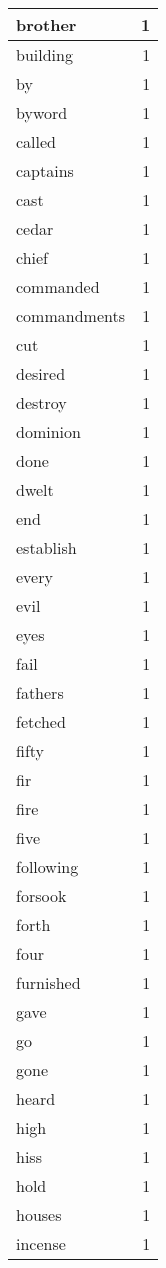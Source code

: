 \begin{center}
\begin{longtable}{l|r}
brother & 1 \\ \hline
building & 1 \\ \hline
by & 1 \\ \hline
byword & 1 \\ \hline
called & 1 \\ \hline
captains & 1 \\ \hline
cast & 1 \\ \hline
cedar & 1 \\ \hline
chief & 1 \\ \hline
commanded & 1 \\ \hline
commandments & 1 \\ \hline
cut & 1 \\ \hline
desired & 1 \\ \hline
destroy & 1 \\ \hline
dominion & 1 \\ \hline
done & 1 \\ \hline
dwelt & 1 \\ \hline
end & 1 \\ \hline
establish & 1 \\ \hline
every & 1 \\ \hline
evil & 1 \\ \hline
eyes & 1 \\ \hline
fail & 1 \\ \hline
fathers & 1 \\ \hline
fetched & 1 \\ \hline
fifty & 1 \\ \hline
fir & 1 \\ \hline
fire & 1 \\ \hline
five & 1 \\ \hline
following & 1 \\ \hline
forsook & 1 \\ \hline
forth & 1 \\ \hline
four & 1 \\ \hline
furnished & 1 \\ \hline
gave & 1 \\ \hline
go & 1 \\ \hline
gone & 1 \\ \hline
heard & 1 \\ \hline
high & 1 \\ \hline
hiss & 1 \\ \hline
hold & 1 \\ \hline
houses & 1 \\ \hline
incense & 1 \\ \hline

\end{longtable}
\end{center}
